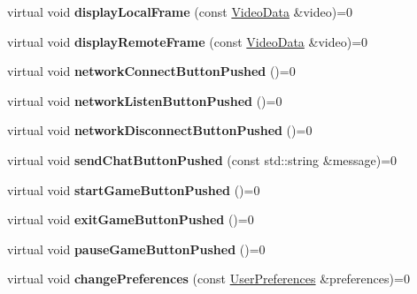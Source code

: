 \begin{DoxyCompactItemize}
\item 
\hypertarget{classUserInterface_aa8ca05eacdd98bba205f549c2bbc739c}{
virtual void {\bfseries displayLocalFrame} (const \hyperlink{structVideoData}{VideoData} \&video)=0}
\label{classUserInterface_aa8ca05eacdd98bba205f549c2bbc739c}

\item 
\hypertarget{classUserInterface_ac3afeafc97a2bad45b124975a24cb633}{
virtual void {\bfseries displayRemoteFrame} (const \hyperlink{structVideoData}{VideoData} \&video)=0}
\label{classUserInterface_ac3afeafc97a2bad45b124975a24cb633}

\item 
\hypertarget{classUserInterface_a1b12a2289689bd1d907c87421b78bfb3}{
virtual void {\bfseries networkConnectButtonPushed} ()=0}
\label{classUserInterface_a1b12a2289689bd1d907c87421b78bfb3}

\item 
\hypertarget{classUserInterface_a0bcb21302e8bad1fab6864e688f90600}{
virtual void {\bfseries networkListenButtonPushed} ()=0}
\label{classUserInterface_a0bcb21302e8bad1fab6864e688f90600}

\item 
\hypertarget{classUserInterface_a5b58c16329d4c76efdc2e27b7a3ad3f6}{
virtual void {\bfseries networkDisconnectButtonPushed} ()=0}
\label{classUserInterface_a5b58c16329d4c76efdc2e27b7a3ad3f6}

\item 
\hypertarget{classUserInterface_a9016f77640f4197afee05e7e3368f951}{
virtual void {\bfseries sendChatButtonPushed} (const std::string \&message)=0}
\label{classUserInterface_a9016f77640f4197afee05e7e3368f951}

\item 
\hypertarget{classUserInterface_ae6b475f54fc90a950718312ab1c5ac6e}{
virtual void {\bfseries startGameButtonPushed} ()=0}
\label{classUserInterface_ae6b475f54fc90a950718312ab1c5ac6e}

\item 
\hypertarget{classUserInterface_acff5ed6d4703ee489e00eab5463e7227}{
virtual void {\bfseries exitGameButtonPushed} ()=0}
\label{classUserInterface_acff5ed6d4703ee489e00eab5463e7227}

\item 
\hypertarget{classUserInterface_aee390b73f66a0ed6f8511bf5eff7edb1}{
virtual void {\bfseries pauseGameButtonPushed} ()=0}
\label{classUserInterface_aee390b73f66a0ed6f8511bf5eff7edb1}

\item 
\hypertarget{classUserInterface_a9cd95da39bf37d49427d8f5b0b8eb862}{
virtual void {\bfseries changePreferences} (const \hyperlink{structUserPreferences}{UserPreferences} \&preferences)=0}
\label{classUserInterface_a9cd95da39bf37d49427d8f5b0b8eb862}


\end{DoxyCompactItemize}

